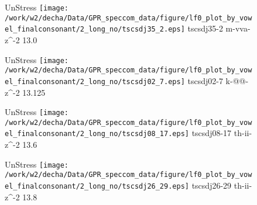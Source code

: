 \documentclass{article}
\begin{document}
\begin{figure}[t]
\begin{minipage}[b]{.24\textwidth}
UnStress
\centering
\texttt{[image: /work/w2/decha/Data/GPR\_speccom\_data/figure/lf0\_plot\_by\_vowel\_finalconsonant/2\_long\_no/tscsdj35\_2.eps]}
tscsdj35-2 m-vva-z\textasciicircum-2 13.0
\end{minipage}
\begin{minipage}[b]{.24\textwidth}
UnStress
\centering
\texttt{[image: /work/w2/decha/Data/GPR\_speccom\_data/figure/lf0\_plot\_by\_vowel\_finalconsonant/2\_long\_no/tscsdj02\_7.eps]}
tscsdj02-7 k-@@-z\textasciicircum-2 13.125
\end{minipage}
\begin{minipage}[b]{.24\textwidth}
UnStress
\centering
\texttt{[image: /work/w2/decha/Data/GPR\_speccom\_data/figure/lf0\_plot\_by\_vowel\_finalconsonant/2\_long\_no/tscsdj08\_17.eps]}
tscsdj08-17 th-ii-z\textasciicircum-2 13.6
\end{minipage}
\begin{minipage}[b]{.24\textwidth}
UnStress
\centering
\texttt{[image: /work/w2/decha/Data/GPR\_speccom\_data/figure/lf0\_plot\_by\_vowel\_finalconsonant/2\_long\_no/tscsdj26\_29.eps]}
tscsdj26-29 th-ii-z\textasciicircum-2 13.8
\end{minipage}
\end{figure}
\end{document}
